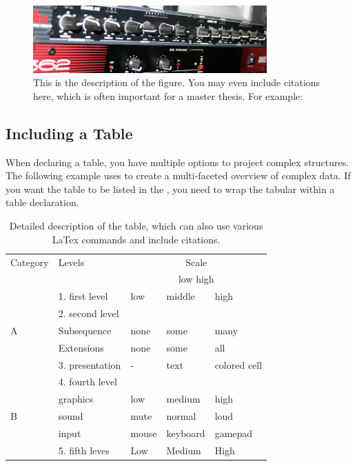 \begin{figure}[H]
\begin{center}
\includegraphics[width=0.8\textwidth]{media/amp.jpg}
\end{center}
\caption[Figure description for the table of content.]{This is the description of the figure. You may even include citations here, which is often important for a master thesis. For example: \citep{SkieThea2008}}
\end{figure}


\newpage
\subsection{Including a Table}

When declaring a table, you have multiple options to project complex structures. The following example uses  to create a multi-faceted overview of complex data. If you want the table to be listed in the , you need to wrap the tabular within a table declaration.

\begin{table}[H]
\begin{tabular}{| l | l | l | l | l |}
\hline
 Category & Levels & \multicolumn{3}{c|}{Scale} \\
&&\multicolumn{3}{c|}{low \hspace*{\fill} high}\\
\hline
 \multirow{5}{*}{A} & 1. first level & low & middle & high \\ \cline{2-5}
 & 2. second level & & & \\ 
 & Subsequence & none & some &many \\
 & Extensions & none & some & all\\ \cline{2-5}
 & 3. presentation & - & text & \cellcolor{green}colored cell \\
\hline
 \multirow{5}{*}{B} & 4. fourth level &  &  &  \\ \cline{2-5}
 & graphics & low & medium & high\\ 
 & sound & mute & normal & loud \\
 & input & mouse & keyboard & gamepad\\ \cline{2-5}
 & 5. fifth leves & Low & Medium & High \\
\hline
\end{tabular}
\caption[Table description for list of tables.]{Detailed description of the table, which can also use various LaTex commands and include citations.}
\end{table}






